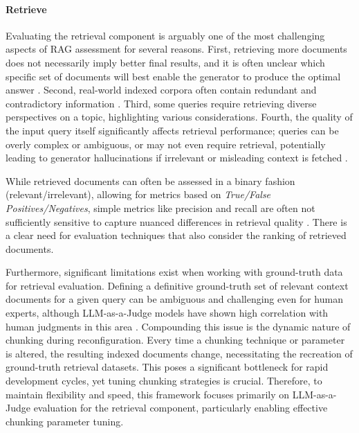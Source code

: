 \paragraph{Retrieve}
Evaluating the retrieval component is arguably one of the most challenging aspects of RAG assessment for several reasons. First, retrieving more documents does not necessarily imply better final results, and it is often unclear which specific set of documents will best enable the generator to produce the optimal answer \cite{Jin.5222024}. Second, real-world indexed corpora often contain redundant and contradictory information \cite{Yu.2024}. Third, some queries require retrieving diverse perspectives on a topic, highlighting various considerations. Fourth, the quality of the input query itself significantly affects retrieval performance; queries can be overly complex or ambiguous, or may not even require retrieval, potentially leading to generator hallucinations if irrelevant or misleading context is fetched \cite{Huang.2023, Mallen.20.12.2022}.

While retrieved documents can often be assessed in a binary fashion (relevant/irrelevant), allowing for metrics based on \textit{True/False Positives/Negatives}, simple metrics like precision and recall are often not sufficiently sensitive to capture nuanced differences in retrieval quality \cite{Yu.2024}. There is a clear need for evaluation techniques that also consider the ranking of retrieved documents.

Furthermore, significant limitations exist when working with ground-truth data for retrieval evaluation. Defining a definitive ground-truth set of relevant context documents for a given query can be ambiguous and challenging even for human experts, although LLM-as-a-Judge models have shown high correlation with human judgments in this area \cite{Chiang.2023}. Compounding this issue is the dynamic nature of chunking during reconfiguration. Every time a chunking technique or parameter is altered, the resulting indexed documents change, necessitating the recreation of ground-truth retrieval datasets. This poses a significant bottleneck for rapid development cycles, yet tuning chunking strategies is crucial. Therefore, to maintain flexibility and speed, this framework focuses primarily on LLM-as-a-Judge evaluation for the retrieval component, particularly enabling effective chunking parameter tuning.

